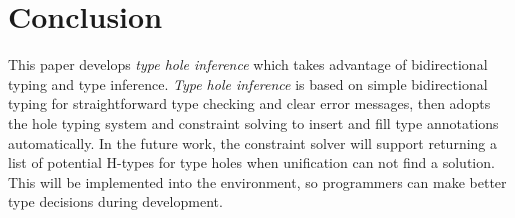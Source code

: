 \section{Conclusion}
\label{sec:conclusion}
This paper develops \emph{type hole inference} which takes advantage of bidirectional typing and type inference. \emph{Type hole inference} is based on simple bidirectional typing for straightforward type checking and clear error messages, then adopts the hole typing system and constraint solving to insert and fill type annotations automatically. In the future work, the constraint solver will support returning a list of potential H-types for type holes when unification can not find a solution. This will be implemented into the \Hazel environment, so programmers can make better type decisions during development. 
